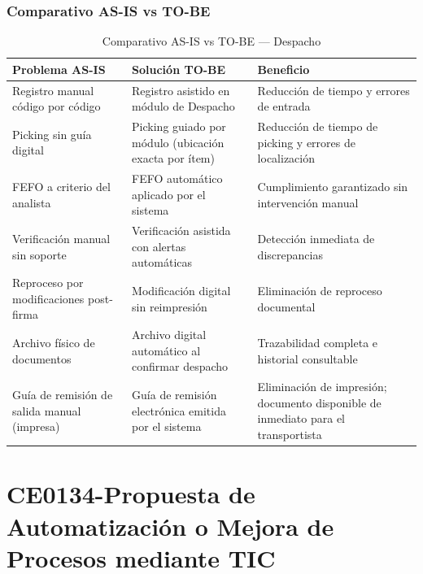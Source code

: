 \documentclass[11pt, a4paper, oneside]{report}
\begin{document}
\subsection{Comparativo AS-IS vs TO-BE}

\begin{table}[H]
\centering\small
\renewcommand{\arraystretch}{1.3}
\setlength{\tabcolsep}{4pt}
\begin{tabularx}{\textwidth}{|>{\raggedright\arraybackslash}p{}|>{\raggedright\arraybackslash}p{}|>{\raggedright\arraybackslash}X|}
\hline
\rowcolor{upeu_dark}
\color{white}\bfseries Problema AS-IS & \color{white}\bfseries Solución TO-BE & \color{white}\bfseries Beneficio \\ \hline
\rowcolor{gray!10}
Registro manual código por código & Registro asistido en módulo de Despacho & Reducción de tiempo y errores de entrada \\ \hline
Picking sin guía digital & Picking guiado por módulo (ubicación exacta por ítem) & Reducción de tiempo de picking y errores de localización \\ \hline
\rowcolor{gray!10}
FEFO a criterio del analista & FEFO automático aplicado por el sistema & Cumplimiento garantizado sin intervención manual \\ \hline
Verificación manual sin soporte & Verificación asistida con alertas automáticas & Detección inmediata de discrepancias \\ \hline
\rowcolor{gray!10}
Reproceso por modificaciones post-firma & Modificación digital sin reimpresión & Eliminación de reproceso documental \\ \hline
Archivo físico de documentos & Archivo digital automático al confirmar despacho & Trazabilidad completa e historial consultable \\ \hline
\rowcolor{gray!10}
Guía de remisión de salida manual (impresa) & Guía de remisión electrónica emitida por el sistema & Eliminación de impresión; documento disponible de inmediato para el transportista \\ \hline
\end{tabularx}
\caption{Comparativo AS-IS vs TO-BE --- Despacho}
\end{table}


\chapter{CE0134-Propuesta de Automatización o Mejora de Procesos mediante TIC}
\end{document}
